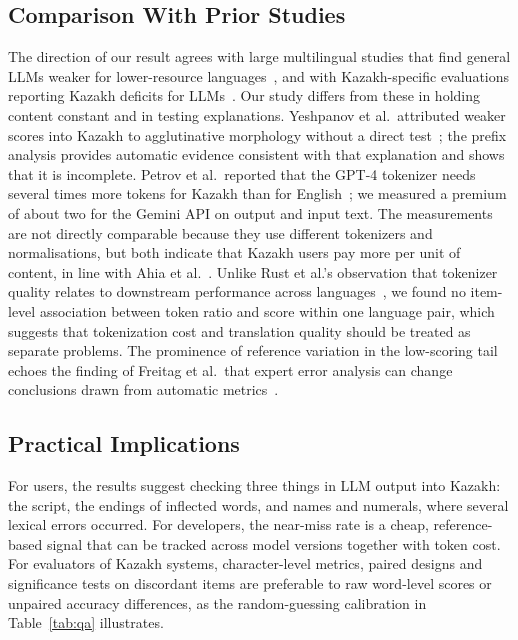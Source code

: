 \subsection{Comparison With Prior Studies}
The direction of our result agrees with large multilingual studies that find general LLMs weaker for lower-resource languages~\cite{robinson2023chatgpt,zhu2024multilingual,ahuja2023mega}, and with Kazakh-specific evaluations reporting Kazakh deficits for LLMs~\cite{togmanov2025kazmmlu,maxutov2024kazakh}. Our study differs from these in holding content constant and in testing explanations. Yeshpanov et al.\ attributed weaker scores into Kazakh to agglutinative morphology without a direct test~\cite{yeshpanov2024kazparc}; the prefix analysis provides automatic evidence consistent with that explanation and shows that it is incomplete. Petrov et al.\ reported that the GPT-4 tokenizer needs several times more tokens for Kazakh than for English~\cite{petrov2023tokenizer}; we measured a premium of about two for the Gemini API on output and input text. The measurements are not directly comparable because they use different tokenizers and normalisations, but both indicate that Kazakh users pay more per unit of content, in line with Ahia et al.~\cite{ahia2023cost}. Unlike Rust et al.'s observation that tokenizer quality relates to downstream performance across languages~\cite{rust2021tokenizer}, we found no item-level association between token ratio and score within one language pair, which suggests that tokenization cost and translation quality should be treated as separate problems. The prominence of reference variation in the low-scoring tail echoes the finding of Freitag et al.\ that expert error analysis can change conclusions drawn from automatic metrics~\cite{freitag2021experts}.

\subsection{Practical Implications}
For users, the results suggest checking three things in LLM output into Kazakh: the script, the endings of inflected words, and names and numerals, where several lexical errors occurred. For developers, the near-miss rate is a cheap, reference-based signal that can be tracked across model versions together with token cost. For evaluators of Kazakh systems, character-level metrics, paired designs and significance tests on discordant items are preferable to raw word-level scores or unpaired accuracy differences, as the random-guessing calibration in Table~\ref{tab:qa} illustrates.

